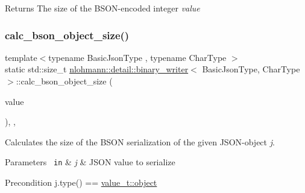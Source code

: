 \begin{DoxyReturn}{Returns}
The size of the B\+S\+O\+N-\/encoded integer {\itshape value} 
\end{DoxyReturn}
\mbox{\label{classnlohmann_1_1detail_1_1binary__writer_acc6f1cc1fd370ee84ebc8cf7b8712840}} 
\subsubsection{\texorpdfstring{calc\_bson\_object\_size()}{calc\_bson\_object\_size()}}
{\footnotesize\ttfamily template$<$typename Basic\+Json\+Type , typename Char\+Type $>$ \\
static std\+::size\+\_\+t \mbox{\hyperlink{classnlohmann_1_1detail_1_1binary__writer}{nlohmann\+::detail\+::binary\+\_\+writer}}$<$ Basic\+Json\+Type, Char\+Type $>$\+::calc\+\_\+bson\+\_\+object\+\_\+size (\begin{DoxyParamCaption}\item[{const typename Basic\+Json\+Type\+::object\+\_\+t \&}]{value }\end{DoxyParamCaption})\hspace{0.3cm}{\ttfamily [inline]}, {\ttfamily [static]}, {\ttfamily [private]}}



Calculates the size of the B\+S\+ON serialization of the given J\+S\+O\+N-\/object {\itshape j}. 


\begin{DoxyParams}[1]{Parameters}
\mbox{\texttt{ in}}  & {\em j} & J\+S\+ON value to serialize \\
\hline
\end{DoxyParams}
\begin{DoxyPrecond}{Precondition}
j.\+type() == \mbox{\hyperlink{namespacenlohmann_1_1detail_a1ed8fc6239da25abcaf681d30ace4985aa8cfde6331bd59eb2ac96f8911c4b666}{value\+\_\+t\+::object}} 
\end{DoxyPrecond}
\mbox{\label{classnlohmann_1_1detail_1_1binary__writer_aea44fd97a5cb9b4f175e66e3e4fdf158}} 
